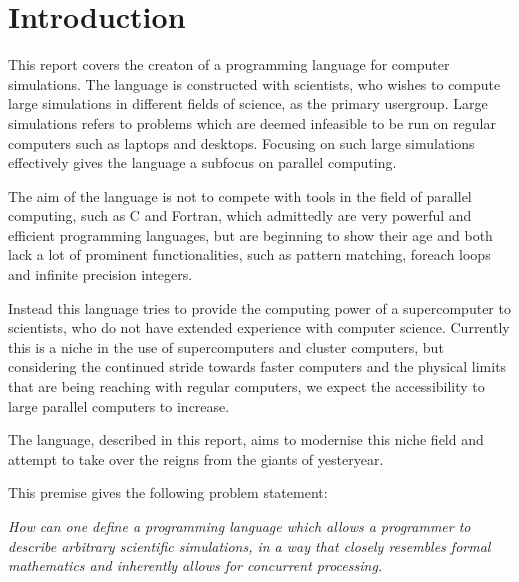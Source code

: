 \chapter{Introduction}\label{part:introduction}

This report covers the creaton of a programming language for computer simulations. The language is constructed with scientists, who wishes to compute large simulations in different fields of science, as the primary usergroup. Large simulations refers to problems which are deemed infeasible to be run on regular computers such as laptops and desktops. Focusing on such large simulations effectively gives the language a subfocus on parallel computing.

The aim of the language is not to compete with tools in the field of parallel computing, such as C and Fortran, which admittedly are very powerful and efficient programming languages, but are beginning to show their age and both lack a lot of prominent functionalities, such as pattern matching, foreach loops and infinite precision integers. 

Instead this language tries to provide the computing power of a supercomputer to scientists, who do not have extended experience with computer science. Currently this is a niche in the use of supercomputers and cluster computers, but considering the continued stride towards faster computers and the physical limits that are being reaching with regular computers, we expect the accessibility to large parallel computers to increase. 

The language, described in this report, aims to modernise this niche field and attempt to take over the reigns from the giants of yesteryear.

This premise gives the following problem statement:

\emph{How can one define a programming language which allows a programmer to describe arbitrary scientific simulations, in a way that closely resembles formal mathematics and inherently allows for concurrent processing.}
